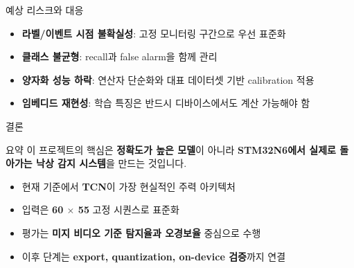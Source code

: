 \documentclass[aspectratio=169]{beamer}
\begin{document}
\begin{frame}{예상 리스크와 대응}
  \begin{itemize}
    \item \textbf{라벨/이벤트 시점 불확실성}: 고정 모니터링 구간으로 우선 표준화
    \item \textbf{클래스 불균형}: recall과 false alarm을 함께 관리
    \item \textbf{양자화 성능 하락}: 연산자 단순화와 대표 데이터셋 기반 calibration 적용
    \item \textbf{임베디드 재현성}: 학습 특징은 반드시 디바이스에서도 계산 가능해야 함
  \end{itemize}
\end{frame}

\begin{frame}{결론}
  \begin{block}{요약}
    이 프로젝트의 핵심은 \textbf{정확도가 높은 모델}이 아니라 \textbf{STM32N6에서 실제로 돌아가는 낙상 감지 시스템}을 만드는 것입니다.
  \end{block}

  \begin{itemize}
    \item 현재 기준에서 \textbf{TCN}이 가장 현실적인 주력 아키텍처
    \item 입력은 \textbf{60 $\times$ 55} 고정 시퀀스로 표준화
    \item 평가는 \textbf{미지 비디오 기준 탐지율과 오경보율} 중심으로 수행
    \item 이후 단계는 \textbf{export, quantization, on-device 검증}까지 연결
  \end{itemize}
\end{frame}
\end{document}
